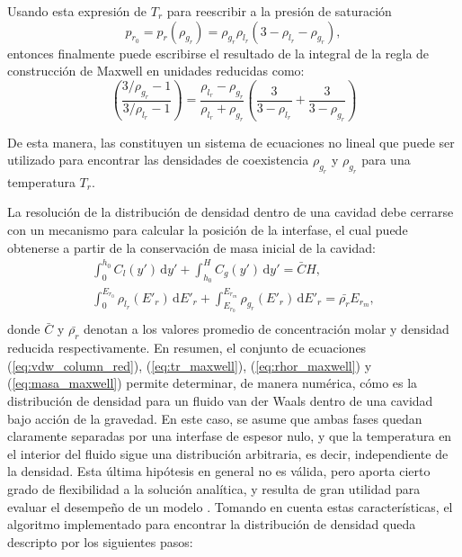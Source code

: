Usando esta expresi\'on de $T_r$ para reescribir a la presi\'on de saturaci\'on
\begin{equation}
	p_{r_0} = p_r(\rho_{g_r}) = \rho_{g_r} \rho_{l_r} ( 3 - \rho_{l_r} - \rho_{g_r} ),
\end{equation}
entonces finalmente puede escribirse el resultado de la integral de la regla de construcci\'on de Maxwell en unidades reducidas como:
\begin{equation}
	\left( \dfrac{3/\rho_{g_r}-1}{3/\rho_{l_r}-1} \right) = \dfrac{\rho_{l_r} - \rho_{g_r}}{\rho_{l_r} + \rho_{g_r}}\left( \dfrac{3}{3-\rho_{l_r}} + \dfrac{3}{3-\rho_{g_r}} \right)
	\label{eq:rhor_maxwell}
\end{equation}

De esta manera, las  constituyen un sistema de ecuaciones no lineal que puede ser utilizado para encontrar las densidades de coexistencia $\rho_{g_r}$ y $\rho_{g_r}$ para una temperatura $T_r$.

La resoluci\'on de la distribuci\'on de densidad dentro de una cavidad debe cerrarse con un mecanismo para calcular la posici\'on de la interfase, el cual puede obtenerse a partir de la conservaci\'on de masa inicial de la cavidad:
\begin{equation}
	\begin{gathered}
		\int_{0}^{h_0} C_l(y') \, \mbox{d}y' + \int_{h_0}^{H} C_g(y') \, \mbox{d}y' = \bar{C}H ,\\[3mm]
		\int_{0}^{E_{r_0}} \rho_{l_r} (E'_r) \, \mbox{d}E'_r + \int_{E_{r_0}}^{E_{r_m}} \rho_{g_r}(E'_r) \, \mbox{d}E'_r = \bar{\rho_r}E_{r_m}, \\
	\end{gathered}
	\label{eq:masa_maxwell}
\end{equation}
donde $\bar{C}$ y $\bar{\rho_r}$ denotan a los valores promedio de concentraci\'on molar y densidad reducida respectivamente. En resumen, el conjunto de ecuaciones (\ref{eq:vdw_column_red}), (\ref{eq:tr_maxwell}), (\ref{eq:rhor_maxwell}) y (\ref{eq:masa_maxwell}) permite determinar, de manera num\'erica, c\'omo es la distribuci\'on de densidad para un fluido van der Waals dentro de una cavidad  bajo acci\'on de la gravedad. En este caso, se asume que ambas fases quedan claramente separadas por una interfase de espesor nulo, y que la temperatura en el interior del fluido sigue una distribuci\'on arbitraria, es decir, independiente de la densidad.  Esta \'ultima hip\'otesis en general no es v\'alida, pero aporta cierto grado de flexibilidad a la soluci\'on anal\'itica, y resulta de gran utilidad para evaluar el desempe\~no de un modelo \pp{}. Tomando en cuenta estas caracter\'isticas, el algoritmo implementado para encontrar la distribuci\'on de densidad queda descripto por los siguientes pasos:

